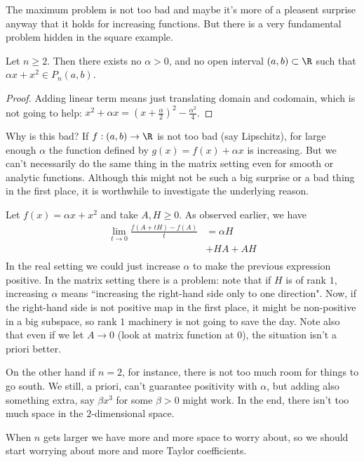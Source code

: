 The maximum problem is not too bad and maybe it's more of a pleasent surprise anyway that it holds for increasing functions. But there is a very fundamental problem hidden in the square example.

\begin{prop}
	Let $n \geq 2$. Then there exists no $\alpha > 0$, and no open interval $(a, b) \subset \R$ such that $\alpha x + x^{2} \in P_{n}(a, b)$.
\end{prop}
\begin{proof}
	Adding linear term means just translating domain and codomain, which is not going to help: $x^2 + \alpha x = (x + \frac{\alpha}{2})^2 - \frac{\alpha^2}{4}$.
\end{proof}

Why is this bad? If $f : (a, b) \to \R$ is not too bad (say Lipschitz), for large enough $\alpha$ the function defined by $g(x) = f(x) + \alpha x$ is increasing. But we can't necessarily do the same thing in the matrix setting even for smooth or analytic functions. Although this might not be such a big surprise or a bad thing in the first place, it is worthwhile to investigate the underlying reason.

Let $f(x) = \alpha x + x^2$ and take $A, H \geq 0$. As observed earlier, we have
\begin{align*}
	\lim_{t \to 0} \frac{f(A + t H) - f(A)}{t} &= \alpha H \\
	&+ H A + A H\\
\end{align*}
In the real setting we could just increase $\alpha$ to make the previous expression positive. In the matrix setting there is a problem: note that if $H$ is of rank $1$, increasing $\alpha$ means ``increasing the right-hand side only to one direction". Now, if the right-hand side is not positive map in the first place, it might be non-positive in a big subspace, so rank $1$ machinery is not going to save the day. Note also that even if we let $A \to 0$ (look at matrix function at $0$), the situation isn't a priori better.

On the other hand if $n = 2$, for instance, there is not too much room for things to go south. We still, a priori, can't guarantee positivity with $\alpha$, but adding also something extra, say $\beta x^3$ for some $\beta > 0$ might work. In the end, there isn't too much space in the $2$-dimensional space.

When $n$ gets larger we have more and more space to worry about, so we should start worrying about more and more Taylor coefficients.

